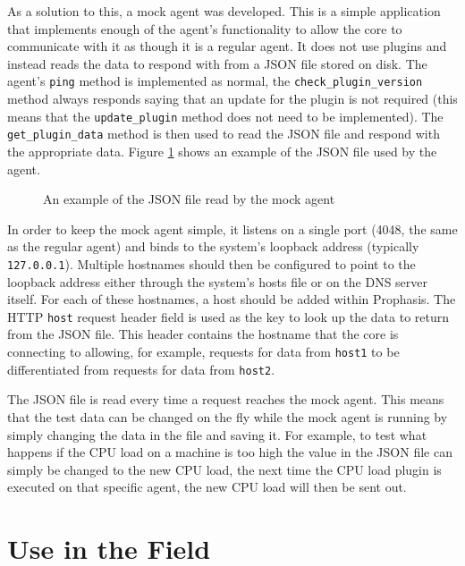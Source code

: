 \documentclass[bsc,deptreport,twoside,parskip,singlespacing,notimes]{infthesis}
\begin{document}
	As a solution to this, a mock agent was developed.  This is a simple application
	that implements enough of the agent's functionality to allow the core to
	communicate with it as though it is a regular agent.  It does not use plugins
	and instead reads the data to respond with from a JSON file stored on disk. The
	agent's \texttt{ping} method is implemented as normal, the
	\texttt{check\_plugin\_version} method always responds saying that an update for
	the plugin is not required (this means that the \texttt{update\_plugin} method does
	not need to be implemented).  The \texttt{get\_plugin\_data} method is then
	used to read the JSON file and respond with the appropriate data. Figure
	\ref{mock-agent-data} shows an example of the JSON file used by the agent.

\begin{figure}[H]
	\caption{An example of the JSON file read by the mock agent}
	\label{mock-agent-data}
	
\end{figure}


	In order to keep the mock agent simple, it listens on a single port (4048, the
	same as the regular agent) and binds to the system's loopback address 
	(typically \texttt{127.0.0.1}).  Multiple hostnames should then be configured
	to point to the loopback address either through the system's hosts file or on
	the DNS server itself.  For each of these hostnames, a host should be added
	within Prophasis.  The HTTP \texttt{host} request header field is used as the
	key to look up the data to return from the JSON file. This header contains the
	hostname that the core is connecting to allowing, for example, requests for
	data from \texttt{host1} to be differentiated from requests for data from 
	\texttt{host2}.


	The JSON file is read every time a request reaches the mock agent.  This means
	that the test data can be changed on the fly while the mock agent is running by
	simply changing the data in the file and saving it.  For example, to test what
	happens if the CPU load on a machine is too high the value in the JSON file can
	simply be changed to the new CPU load, the next time the CPU
	load plugin is executed on that specific agent, the new CPU load will then be
	sent out.

\section{Use in the Field}
\end{document}

